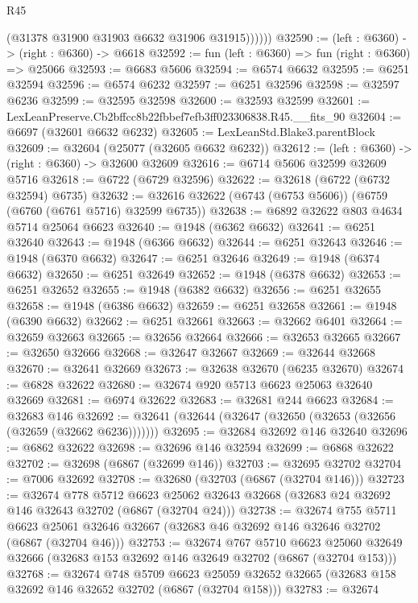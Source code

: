 \begin{lexlean}{R45}
\begin{coremodule}
{              (@31378 @31900 @31903 @6632 @31906 @31915))))))
@32590 := (left : @6360) -> (right : @6360) -> @6618
@32592 := fun (left : @6360) => fun (right : @6360) => @25066
@32593 := @6683 @5606
@32594 := @6574 @6632
@32595 := @6251 @32594
@32596 := @6574 @6232
@32597 := @6251 @32596
@32598 := @32597 @6236
@32599 := @32595 @32598
@32600 := @32593 @32599
@32601 := LexLeanPreserve.Cb2bffcc8b22fbbef7efb3ff023306838.R45.__fits_90
@32604 := @6697 (@32601 @6632 @6232)
@32605 := LexLeanStd.Blake3.parentBlock
@32609 := @32604 (@25077 (@32605 @6632 @6232))
@32612 := (left : @6360) -> (right : @6360) -> @32600 @32609
@32616 := @6714 @5606 @32599 @32609 @5716
@32618 := @6722 (@6729 @32596)
@32622 := @32618 (@6722 (@6732 @32594) @6735)
@32632 := @32616 @32622 (@6743 (@6753 @5606)) (@6759 (@6760 (@6761 @5716) @32599 @6735))
@32638 := @6892 @32622 @803 @4634 @5714 @25064 @6623
@32640 := @1948 (@6362 @6632)
@32641 := @6251 @32640
@32643 := @1948 (@6366 @6632)
@32644 := @6251 @32643
@32646 := @1948 (@6370 @6632)
@32647 := @6251 @32646
@32649 := @1948 (@6374 @6632)
@32650 := @6251 @32649
@32652 := @1948 (@6378 @6632)
@32653 := @6251 @32652
@32655 := @1948 (@6382 @6632)
@32656 := @6251 @32655
@32658 := @1948 (@6386 @6632)
@32659 := @6251 @32658
@32661 := @1948 (@6390 @6632)
@32662 := @6251 @32661
@32663 := @32662 @6401
@32664 := @32659 @32663
@32665 := @32656 @32664
@32666 := @32653 @32665
@32667 := @32650 @32666
@32668 := @32647 @32667
@32669 := @32644 @32668
@32670 := @32641 @32669
@32673 := @32638 @32670 (@6235 @32670)
@32674 := @6828 @32622
@32680 := @32674 @920 @5713 @6623 @25063 @32640 @32669
@32681 := @6974 @32622
@32683 := @32681 @244 @6623
@32684 := @32683 @146
@32692 := @32641 (@32644 (@32647 (@32650 (@32653 (@32656 (@32659 (@32662 @6236)))))))
@32695 := @32684 @32692 @146 @32640
@32696 := @6862 @32622
@32698 := @32696 @146 @32594
@32699 := @6868 @32622
@32702 := @32698 (@6867 (@32699 @146))
@32703 := @32695 @32702
@32704 := @7006 @32692
@32708 := @32680 (@32703 (@6867 (@32704 @146)))
@32723 := @32674
    @778
    @5712
    @6623
    @25062
    @32643
    @32668
    (@32683 @24 @32692 @146 @32643 @32702 (@6867 (@32704 @24)))
@32738 := @32674
    @755
    @5711
    @6623
    @25061
    @32646
    @32667
    (@32683 @46 @32692 @146 @32646 @32702 (@6867 (@32704 @46)))
@32753 := @32674
    @767
    @5710
    @6623
    @25060
    @32649
    @32666
    (@32683 @153 @32692 @146 @32649 @32702 (@6867 (@32704 @153)))
@32768 := @32674
    @748
    @5709
    @6623
    @25059
    @32652
    @32665
    (@32683 @158 @32692 @146 @32652 @32702 (@6867 (@32704 @158)))
@32783 := @32674
}
\end{coremodule}
\end{lexlean}

